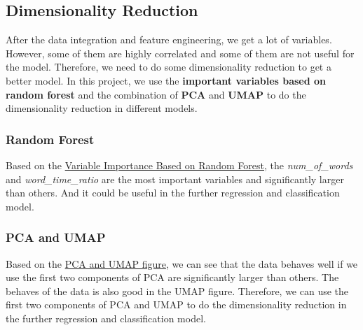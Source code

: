 \documentclass[8pt]{report}
\begin{document}

\subsection{Dimensionality Reduction}
After the data integration and feature engineering, we get a lot of variables.
However, some of them are highly correlated and some of them are not useful for the model.
Therefore, we need to do some dimensionality reduction to get a better model.
In this project, we use the \textbf{important variables based on random forest} and the combination of \textbf{PCA} and \textbf{UMAP} to do the dimensionality reduction in different models.

\subsubsection{Random Forest}
Based on the \hyperref[fig:RF_PCA_and_UMAP]{Variable Importance Based on Random Forest}, the \textit{num\_of\_words} and \textit{word\_time\_ratio} are the most important variables and significantly larger than others. 
And it could be useful in the further regression and classification model. 

\subsubsection{PCA and UMAP}
Based on the \hyperref[fig:RF_PCA_and_UMAP]{PCA and UMAP figure}, we can see that the data behaves well if we use the first two components of PCA are significantly larger than others. The behaves of the data is also good in the UMAP figure. Therefore, we can use the first two components of PCA and UMAP to do the dimensionality reduction in the further regression and classification model.
\end{document}
